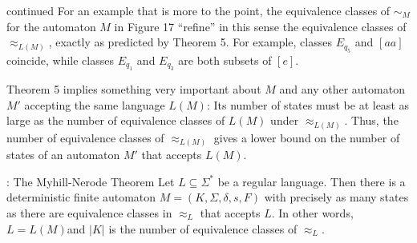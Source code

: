 \setcounter{example}{9}
\begin{example}{ continued}
  For an example that is more to the point, the equivalence classes of $\sim_M$ for the automaton $M$ in Figure 17 ``refine'' in this sense the equivalence classes of $\approx_{L(M)}$, exactly as predicted by Theorem 5. For example, classes $E_{q_5}$ and $\left[aa\right]$ coincide, while classes $E_{q_1}$ and $E_{q_3}$ are both subsets of $\left[ e \right]$.
\end{example}

Theorem 5 implies something very important about $M$ and any other automaton $M'$ accepting the same language $L(M)$: Its number of states must be at least as large as the number of equivalence classes of $L(M)$ under $\approx_{L(M)}$. Thus, the number of equivalence classes of $\approx_{L(M)}$ gives a lower bound on the number of states of an automaton $M'$ that accepts $L(M)$.

\begin{theorem}{: The Myhill-Nerode Theorem}
  Let $L \subseteq \Sigma^*$ be a regular language. Then there is a deterministic finite automaton $M = (K, \Sigma, \delta, s, F)$ with precisely as many states as there are equivalence classes in $\approx_L$ that accepts $L$. In other words, $L = L(M)$and $|K|$ is the number of equivalence classes of $\approx_L$.
\end{theorem}

